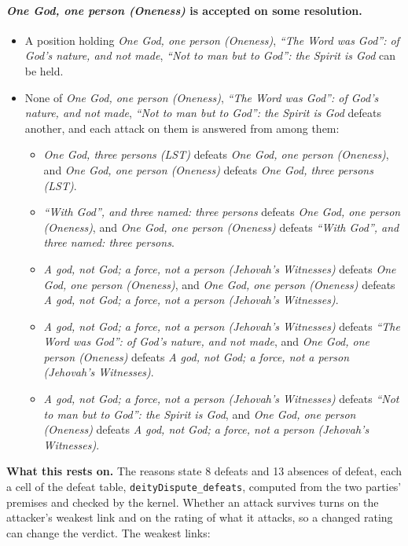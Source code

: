 \documentclass[11pt,paper=\testimonypaper,DIV=13,parskip=false]{scrartcl}
\begin{document}
\paragraph{\emph{One God, one person (Oneness)} is accepted on some resolution.}
\begin{itemize}
\item A position holding \emph{One God, one person (Oneness)}, \emph{“The Word was God”: of God’s nature, and not made}, \emph{“Not to man but to God”: the Spirit is God} can be held.
\item None of \emph{One God, one person (Oneness)}, \emph{“The Word was God”: of God’s nature, and not made}, \emph{“Not to man but to God”: the Spirit is God} defeats another, and each attack on them is answered from among them:
\begin{itemize}
\item \emph{One God, three persons (LST)} defeats \emph{One God, one person (Oneness)}, and \emph{One God, one person (Oneness)} defeats \emph{One God, three persons (LST)}.
\item \emph{“With God”, and three named: three persons} defeats \emph{One God, one person (Oneness)}, and \emph{One God, one person (Oneness)} defeats \emph{“With God”, and three named: three persons}.
\item \emph{A god, not God; a force, not a person (Jehovah’s Witnesses)} defeats \emph{One God, one person (Oneness)}, and \emph{One God, one person (Oneness)} defeats \emph{A god, not God; a force, not a person (Jehovah’s Witnesses)}.
\item \emph{A god, not God; a force, not a person (Jehovah’s Witnesses)} defeats \emph{“The Word was God”: of God’s nature, and not made}, and \emph{One God, one person (Oneness)} defeats \emph{A god, not God; a force, not a person (Jehovah’s Witnesses)}.
\item \emph{A god, not God; a force, not a person (Jehovah’s Witnesses)} defeats \emph{“Not to man but to God”: the Spirit is God}, and \emph{One God, one person (Oneness)} defeats \emph{A god, not God; a force, not a person (Jehovah’s Witnesses)}.
\end{itemize}
\end{itemize}
\par\noindent\textbf{What this rests on.} The reasons state 8 defeats and 13 absences of defeat, each a cell of the defeat table, \texttt{deity\allowbreak{}Dispute\_\allowbreak{}defeats}, computed from the two parties' premises and checked by the kernel. Whether an attack survives turns on the attacker's weakest link and on the rating of what it attacks, so a changed rating can change the verdict. The weakest links:
\end{document}
